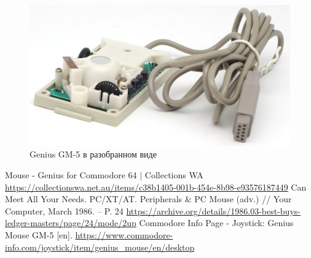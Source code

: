 \documentclass[11pt, a4paper]{article}
\begin{document}
 \begin{figure}[h]
    \centering
    \includegraphics[scale=0.65]{1987_genius_gm5_mouse/inside_30.jpg}
    \caption{Genius GM-5 в разобранном виде}
    \label{fig:GM5MouseInside}
\end{figure}



\begin{thebibliography}{9}
 Mouse - Genius for Commodore 64 | Collections WA \url{https://collectionswa.net.au/items/c38b1405-001b-454e-8b98-e93576187449}
 Can Meet All Your Needs. PC/XT/AT. Peripherals \& PC Mouse (adv.) // Your Computer, March 1986. -- P. 24 \url{https://archive.org/details/1986.03-best-buys-ledger-masters/page/24/mode/2up}
 Commodore Info Page - Joystick: Genius Mouse GM-5 [en]. \url{https://www.commodore-info.com/joystick/item/genius_mouse/en/desktop}
\end{thebibliography}
\end{document}
